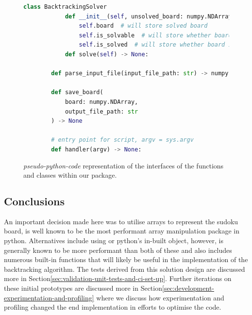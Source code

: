     \begin{figure}[htb]
    \centering
    \begin{lstlisting}[language=Python,label={lst:lstlisting}]
        class BacktrackingSolver
            def __init__(self, unsolved_board: numpy.NDArray)
                self.board  # will store solved board
                self.is_solvable  # will store whether board is solvable
                self.is_solved  # will store whether board is solved
            def solve(self) -> None:

        def parse_input_file(input_file_path: str) -> numpy.NDArray

        def save_board(
            board: numpy.NDArray,
            output_file_path: str
        ) -> None

        # entry point for script, argv = sys.argv
        def handler(argv) -> None:
    \end{lstlisting}
    \caption{\textit{pseudo-python-code} representation of the interfaces of the functions and classes within our
     package.}
    \label{fig:pseudocode}
    \end{figure}

    \subsection{Conclusions}\label{subsec:conclusions}
    An important decision made here was to utilise  arrays to represent the sudoku board,  is well known
    to be the most performant array manipulation package in python.
    Alternatives include using  or python's in-built  object, however, 
    is generally known to be more performant than both of these and  also includes numerous built-in functions
    that will likely be useful in the implementation of the backtracking algorithm.
    The tests derived from this solution design are discussed more in Section\eqref{sec:validation-unit-tests-and-ci-set-up}.
    Further iterations on these initial prototypes are discussed more in Section\eqref{sec:development-experimentation-and-profiling}
    where we discuss how experimentation and profiling changed the end implementation in efforts to optimise the code.

